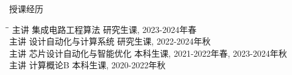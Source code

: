 \begin{rSection}{授课经历}

\begin{tabbing}
\hspace{0.8in}\= \hspace{3.3in}\= \kill
主讲 \> 集成电路工程算法 \> { 研究生课, 2023-2024年春 } \\
主讲 \> 设计自动化与计算系统 \> { 研究生课, 2022-2024年秋} \\
主讲 \> 芯片设计自动化与智能优化 \> { 本科生课, 2021-2022年春, 2023-2024年秋 } \\
主讲 \> 计算概论B \> { 本科生课, 2020-2022年秋 } \\
\end{tabbing}

\end{rSection}

